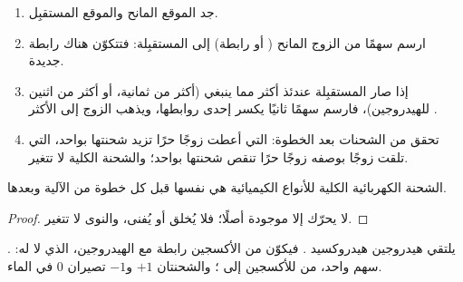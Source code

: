 \begin{method}\label{met:g12:curly-arrows:drawing}
\begin{enumerate}
  \item جد الموقع المانح والموقع المستقبِل.
  \item ارسم سهمًا من الزوج المانح ( أو رابطة) إلى
         المستقبِلة: فتتكوّن هناك رابطة جديدة.
  \item إذا صار  المستقبِلة عندئذ  أكثر مما ينبغي (أكثر
        من ثمانية، أو أكثر من اثنين للهيدروجين)، فارسم سهمًا ثانيًا
        يكسر إحدى روابطها، ويذهب الزوج إلى  الأكثر
        .
  \item تحقق من الشحنات بعد الخطوة:  التي أعطت زوجًا حرًا
        تزيد شحنتها بواحد،  التي تلقت زوجًا بوصفه
        زوجًا حرًا تنقص شحنتها بواحد؛ والشحنة الكلية لا تتغير.
\end{enumerate}
\end{method}

\begin{proposition}\label{prop:g12:curly-arrows:charge}
الشحنة الكهربائية الكلية للأنواع الكيميائية هي نفسها قبل كل خطوة
من الآلية وبعدها.
\end{proposition}

\begin{proof}
لا يحرّك  إلا  موجودة أصلًا؛ فلا 
يُخلق أو يُفنى، والنوى لا تتغير.
\end{proof}

\begin{example}\label{ex:g12:curly-arrows:first}
يلتقي  هيدروجين   هيدروكسيد . فيكوّن  من
الأكسجين رابطة مع  الهيدروجين، الذي لا  له:
. سهم واحد، من  للأكسجين إلى
؛ والشحنتان $+1$ و$-1$ تصيران 0 في  الماء.
\end{example}

